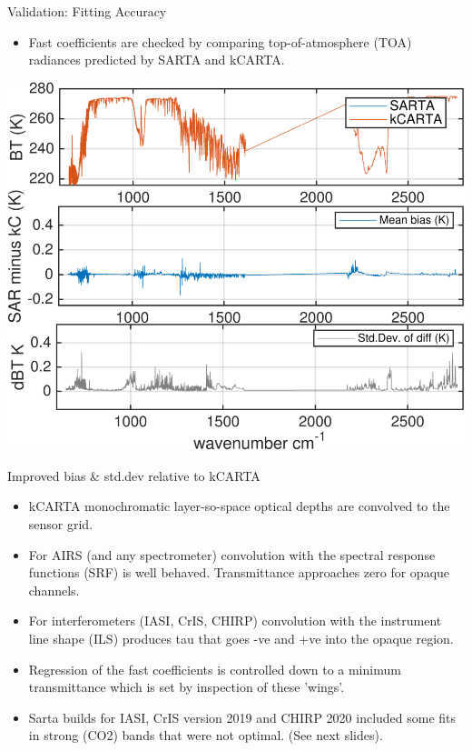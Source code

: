 \documentclass[10pt,t]{beamer}
\begin{document}
\begin{frame}[shrink=5]{Validation: Fitting Accuracy}


\begin{itemize}
    \item Fast coefficients are checked by comparing top-of-atmosphere (TOA) radiances predicted by SARTA and kCARTA.
   \end{itemize}
    \begin{center}
    \includegraphics[width=0.6\linewidth]{./Figs/kc_sar_airs_l1c_mean_bias_stdv_sea_6angs_aslp.png}
  \end{center}
  
\end{frame}
\begin{frame}{Improved bias \& std.dev relative to kCARTA}

  \begin{itemize}
  \item kCARTA monochromatic layer-so-space optical depths are convolved to the sensor grid.
  \item For AIRS (and any spectrometer) convolution with the spectral response functions (SRF) is well behaved. Transmittance approaches zero for opaque channels.
  \item For interferometers (IASI, CrIS, CHIRP) convolution with the instrument line shape (ILS) produces tau that goes -ve and +ve into the opaque region.
  \item Regression of the fast coefficients is controlled down to a minimum transmittance which is set by inspection of these 'wings'.
  \item Sarta builds for IASI, CrIS version 2019 and CHIRP 2020 included some fits in strong (CO2) bands that were not optimal. (See next slides).
  \end{itemize}

\end{frame}
\end{document}
